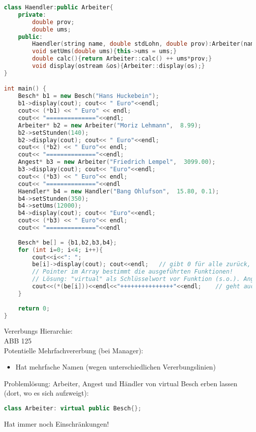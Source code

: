 \begin{lstlisting}[language=C++]
class Haendler:public Arbeiter{
	private:
		double prov;
		double ums;
	public:
		Haendler(string name, double stdLohn, double prov):Arbeiter(name, stdLohn){this->prov=prov;};
		void setUms(double ums){this->ums = ums;}
		double calc(){return Arbeiter::calc() ++ ums*prov;}
		void display(ostream &os){Arbeiter::display(os);}
}

int main() {
	Besch* b1 = new Besch("Hans Huckebein");
	b1->display(cout); cout<< " Euro"<<endl;
	cout<< (*b1) << " Euro" << endl;
	cout<< "=============="<<endl;
	Arbeiter* b2 = new Arbeiter("Moriz Lehmann",  8.99);
	b2->setStunden(140);
	b2->display(cout); cout<< " Euro"<<endl;
	cout<< (*b2) << " Euro"<< endl;
	cout<< "=============="<<endl;
	Angest* b3 = new Arbeiter("Friedrich Lempel",  3099.00);
	b3->display(cout); cout<< "Euro"<<endl;
	cout<< (*b3) << " Euro"<< endl;
	cout<< "=============="<<endl
	Haendler* b4 = new Handler("Bang Ohlufson",  15.80, 0.1);
	b4->setStunden(350);
	b4->setUms(12000);
	b4->display(cout); cout<< "Euro"<<endl;
	cout<< (*b3) << " Euro"<< endl;
	cout<< "=============="<<endl
	
	Besch* be[] = {b1,b2,b3,b4};
	for (int i=0; i<4; i++){
		cout<<i<<": "; 
		be[i]->display(cout); cout<<endl;	// gibt 0 für alle zurück, da nur calc() (und display()) vom Typ Besch ausgeführt, da das Array aus Besch besteht! Die Funktion calc() wurde überschrieben (Vgl. Überladen, wenn bei gleichen Namen verschiedene Paramater angegeben sind)!
		// Pointer im Array bestimmt die ausgeführten Funktionen!
		// Lösung: "virtual" als Schlüsselwort vor Funktion (s.o.). Angeben bei erstem Auftauchen in Vererbungshierarchie
		cout<<(*(be[i]))<<endl<<"+++++++++++++++"<<endl;	// geht auch, da im Operator (die ja nicht virtuell gemacht werden kann, weil sie kein Member ist) die virtuelle display-Fkt aufgerufen wird.
	}	
	
	return 0;
}
\end{lstlisting}
Vererbungs Hierarchie:\\
ABB 125\\
Potentielle Mehrfachvererbung (bei Manager):
\begin{itemize}
\item Hat mehrfache Namen (wegen unterschiedlichen Vererbungslinien)
\end{itemize}
Problemlösung: Arbeiter, Angest und Händler von virtual Besch erben lassen (dort, wo es sich aufzweigt):
\begin{lstlisting}[language=C++]
class Arbeiter: virtual public Besch{};
\end{lstlisting}
Hat immer noch Einschränkungen!

